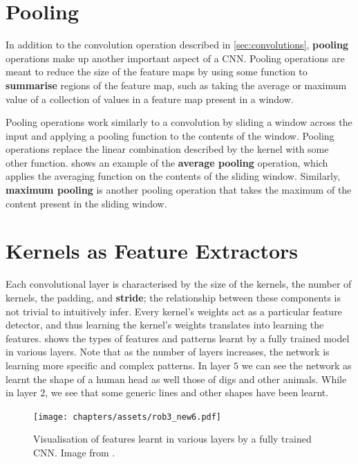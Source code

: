 \section{Pooling}\label{sec:conv-pooling}

In addition to the convolution operation described in \cref{sec:convolutions}, \textbf{pooling} operations make up another important aspect of a CNN. Pooling operations are meant to reduce the size of the feature maps by using some function to \textbf{summarise} regions of the feature map, such as taking the average or maximum value of a collection of values in a feature map present in a window.

Pooling operations work similarly to a convolution by sliding a window across the input and applying a pooling function to the contents of the window. 
Pooling operations replace the linear combination described by the kernel with some other function.  shows an example of the \textbf{average pooling} operation, which applies the averaging function on the contents of the sliding window. Similarly, \textbf{maximum pooling} is another pooling operation that takes the maximum of the content present in the sliding window.

\section{Kernels as Feature Extractors}\label{sec:kernel-feature-extractor}
Each convolutional layer is characterised by the size of the kernels, the number of kernels, the padding, and \textbf{stride}; the relationship between these components is not trivial to intuitively infer. Every kernel's weights act as a particular feature detector, and thus learning the kernel's weights translates into learning the features.  shows the types of features and patterns learnt by a fully trained model in various layers. Note that as the number of layers increases, the network is learning more specific and complex patterns. In layer $5$ we can see the network as learnt the shape of a human head as well those of digs and other animals. While in layer $2$, we see that some generic lines and other shapes have been learnt.

\begin{figure}[ht]
    \centering
    \captionsetup{justification=RaggedRight}
    \texttt{[image: chapters/assets/rob3\_new6.pdf]}
    \caption{Visualisation of features learnt in various layers by a fully trained CNN. Image from \textcite{Zeiler2013}.}
    \label{fig:feature-viz}
\end{figure}